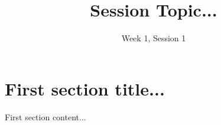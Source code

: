 \documentclass[11pt]{exam}
\title{Session Topic...}
\date{Week 1, Session 1}
\begin{document}
\maketitle

\section{First section title...}
\begin{questions}
\item First section content...
\end{questions}
\end{document}
